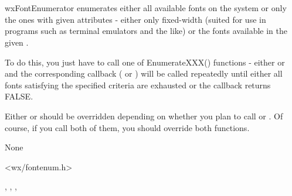 
\section{}\label{wxfontenumerator}

wxFontEnumerator enumerates either all available fonts on the system or only
the ones with given attributes - either only fixed-width (suited for use in
programs such as terminal emulators and the like) or the fonts available in
the given .

To do this, you just have to call one of EnumerateXXX() functions - either 
 or 
 and the
corresponding callback ( or 
) will be called
repeatedly until either all fonts satisfying the specified criteria are
exhausted or the callback returns FALSE.


Either  or 
 should be overridden
depending on whether you plan to call 
 or 
. Of course,
if you call both of them, you should override both functions.


None


<wx/fontenum.h>


, 
, 
, 

